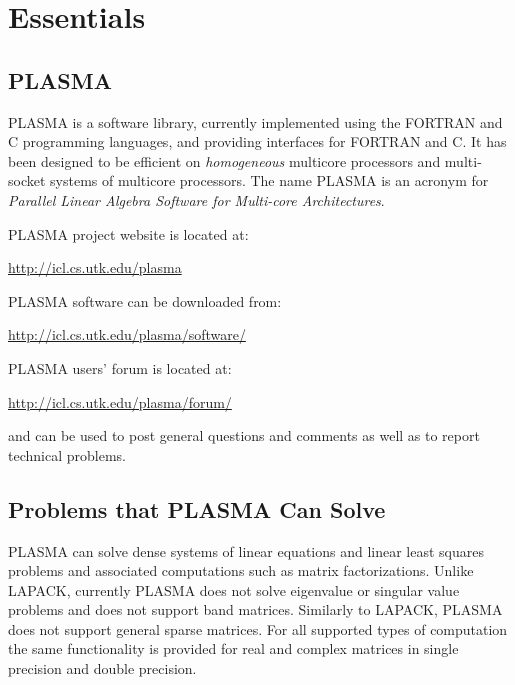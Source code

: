 
\chapter{Essentials}
\setcounter{page}{1}

\section{PLASMA}

PLASMA is a software library, currently implemented using the FORTRAN and C programming languages,
and providing interfaces for FORTRAN and C.
It has been designed to be efficient on {\em homogeneous} multicore processors and \mbox{multi-socket}
systems of multicore processors. The name PLASMA is an acronym for {\em Parallel Linear Algebra
Software for Multi-core Architectures}.

PLASMA project website is located at:
\begin{link_url}
\url{http://icl.cs.utk.edu/plasma}
\end{link_url}

PLASMA software can be downloaded from:
\begin{link_url}
\url{http://icl.cs.utk.edu/plasma/software/}
\end{link_url}

PLASMA users' forum is located at:
\begin{link_url}
\url{http://icl.cs.utk.edu/plasma/forum/}
\end{link_url}
and can be used to post general questions and comments as well as to report technical problems.


\section{Problems that PLASMA Can Solve}

PLASMA can solve dense systems of linear equations and linear least squares problems and associated
computations such as matrix factorizations.
Unlike LAPACK, currently PLASMA does not solve eigenvalue or singular value problems and does not
support band matrices.
Similarly to LAPACK, PLASMA does not support general sparse matrices.
For all supported types of computation the same functionality is provided for real and complex
matrices in single precision and double precision.

